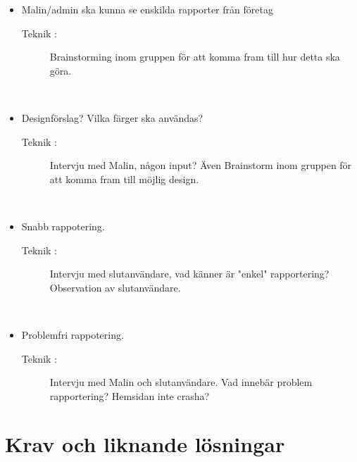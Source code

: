 \documentclass{article}
\begin{document}
\begin{itemize}
             \item Malin/admin ska kunna se enskilda rapporter från företag
                    \begin{description}
                        \item[Teknik :]Brainstorming inom gruppen för att komma fram till hur detta ska göra.
                    \end{description}
                \\
                \item Designförslag? Vilka färger ska användas?
                    \begin{description}
                        \item[Teknik :] Intervju med Malin, någon input? Även Brainstorm inom gruppen för att komma fram till möjlig design.
                    \end{description}
                \\
                 \item Snabb rappotering.
                    \begin{description}
                        \item[Teknik :] Intervju med slutanvändare, vad känner är "enkel" rapportering? Observation av slutanvändare.
                    \end{description}
                 \\
                 \item Problemfri rappotering.
                    \begin{description}
                        \item[Teknik :]Intervju med Malin och slutanvändare. Vad innebär problem rapportering? Hemsidan inte crasha? 
                    \end{description}
                    
                
                
                
                
            \end{itemize}
            
            
        
        
        
   
    
        
    
    
    \newpage
    
\section{Krav och liknande lösningar}
\end{document}
